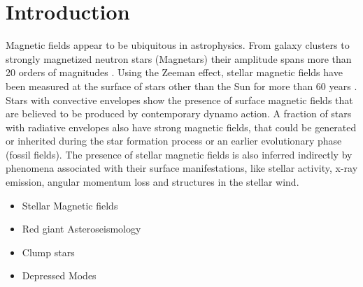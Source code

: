 \section{Introduction}
\label{intro}
Magnetic fields appear to be ubiquitous in astrophysics. From  galaxy clusters to strongly magnetized neutron stars (Magnetars) their amplitude spans more than 20 orders of magnitudes \cite{Brandenburg_2005}. Using the Zeeman effect, stellar magnetic fields have been measured at the surface of stars other than the Sun for more than 60 years \cite{Babcock_1947}. 
Stars with convective envelopes show the presence of surface magnetic fields that are believed to be produced by contemporary dynamo action. A fraction of stars with radiative envelopes also have strong magnetic fields, that could be generated or inherited during the star formation process or an earlier evolutionary phase (fossil fields).
The presence of  stellar magnetic fields is also inferred indirectly by phenomena associated with their surface manifestations, like stellar activity, x-ray emission, angular momentum loss and structures in the stellar wind. 



\begin{itemize}
\item Stellar Magnetic fields
\item Red giant Asteroseismology
\item Clump stars
\item Depressed Modes
\end{itemize}


  